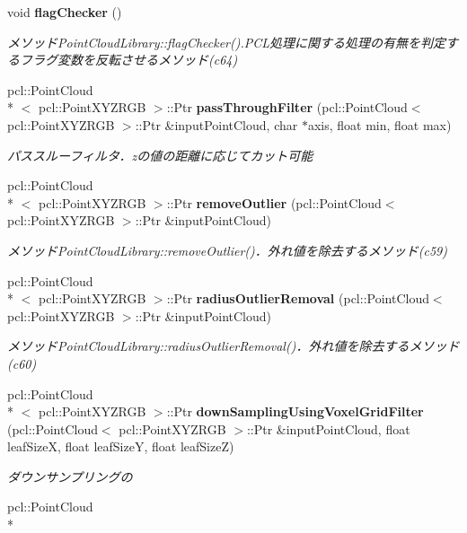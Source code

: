 \begin{DoxyCompactItemize}
void {\bf flag\-Checker} ()
\begin{DoxyCompactList}\small\item\em メソッド\-Point\-Cloud\-Library\-::flag\-Checker().P\-C\-L処理に関する処理の有無を判定するフラグ変数を反転させるメソッド(c64) \end{DoxyCompactList}\item 
pcl\-::\-Point\-Cloud\\*
$<$ pcl\-::\-Point\-X\-Y\-Z\-R\-G\-B $>$\-::Ptr {\bf pass\-Through\-Filter} (pcl\-::\-Point\-Cloud$<$ pcl\-::\-Point\-X\-Y\-Z\-R\-G\-B $>$\-::Ptr \&input\-Point\-Cloud, char $\ast$axis, float min, float max)
\begin{DoxyCompactList}\small\item\em パススルーフィルタ．zの値の距離に応じてカット可能 \end{DoxyCompactList}\item 
pcl\-::\-Point\-Cloud\\*
$<$ pcl\-::\-Point\-X\-Y\-Z\-R\-G\-B $>$\-::Ptr {\bf remove\-Outlier} (pcl\-::\-Point\-Cloud$<$ pcl\-::\-Point\-X\-Y\-Z\-R\-G\-B $>$\-::Ptr \&input\-Point\-Cloud)
\begin{DoxyCompactList}\small\item\em メソッド\-Point\-Cloud\-Library\-::remove\-Outlier()．外れ値を除去するメソッド(c59) \end{DoxyCompactList}\item 
pcl\-::\-Point\-Cloud\\*
$<$ pcl\-::\-Point\-X\-Y\-Z\-R\-G\-B $>$\-::Ptr {\bf radius\-Outlier\-Removal} (pcl\-::\-Point\-Cloud$<$ pcl\-::\-Point\-X\-Y\-Z\-R\-G\-B $>$\-::Ptr \&input\-Point\-Cloud)
\begin{DoxyCompactList}\small\item\em メソッド\-Point\-Cloud\-Library\-::radius\-Outlier\-Removal()．外れ値を除去するメソッド(c60) \end{DoxyCompactList}\item 
pcl\-::\-Point\-Cloud\\*
$<$ pcl\-::\-Point\-X\-Y\-Z\-R\-G\-B $>$\-::Ptr {\bf down\-Sampling\-Using\-Voxel\-Grid\-Filter} (pcl\-::\-Point\-Cloud$<$ pcl\-::\-Point\-X\-Y\-Z\-R\-G\-B $>$\-::Ptr \&input\-Point\-Cloud, float leaf\-Size\-X, float leaf\-Size\-Y, float leaf\-Size\-Z)
\begin{DoxyCompactList}\small\item\em ダウンサンプリングの \end{DoxyCompactList}\item 
pcl\-::\-Point\-Cloud\\*

\end{DoxyCompactItemize}
